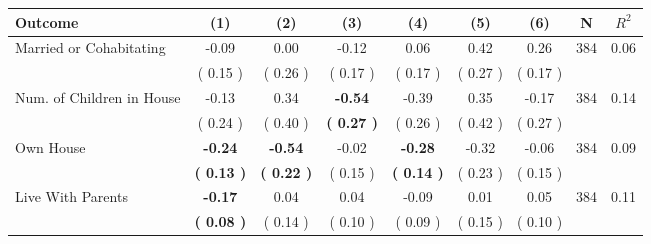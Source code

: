 \begin{tabular}{lcccccccc}
\toprule
 \textbf{Outcome} & \textbf{(1)} & \textbf{(2)} & \textbf{(3)} & \textbf{(4)} & \textbf{(5)} & \textbf{(6)} & \textbf{N} & \textbf{$ R^2$} \\
\midrule
Married or Cohabitating &     -0.09 &      0.00 &     -0.12 &      0.06 &      0.42 &      0.26 & 384 &       0.06 \\ 
 & (     0.15 ) & (     0.26 ) & (     0.17 ) & (     0.17 ) & (     0.27 ) & (     0.17 ) & \\
Num. of Children in House &     -0.13 &      0.34 & \textbf{    -0.54} &     -0.39 &      0.35 &     -0.17 & 384 &       0.14 \\ 
 & (     0.24 ) & (     0.40 ) & \textbf{(     0.27 )} & (     0.26 ) & (     0.42 ) & (     0.27 ) & \\
Own House & \textbf{    -0.24} & \textbf{    -0.54} &     -0.02 & \textbf{    -0.28} &     -0.32 &     -0.06 & 384 &       0.09 \\ 
 & \textbf{(     0.13 )} & \textbf{(     0.22 )} & (     0.15 ) & \textbf{(     0.14 )} & (     0.23 ) & (     0.15 ) & \\
Live With Parents & \textbf{    -0.17} &      0.04 &      0.04 &     -0.09 &      0.01 &      0.05 & 384 &       0.11 \\ 
 & \textbf{(     0.08 )} & (     0.14 ) & (     0.10 ) & (     0.09 ) & (     0.15 ) & (     0.10 ) & \\
\bottomrule
\end{tabular}
